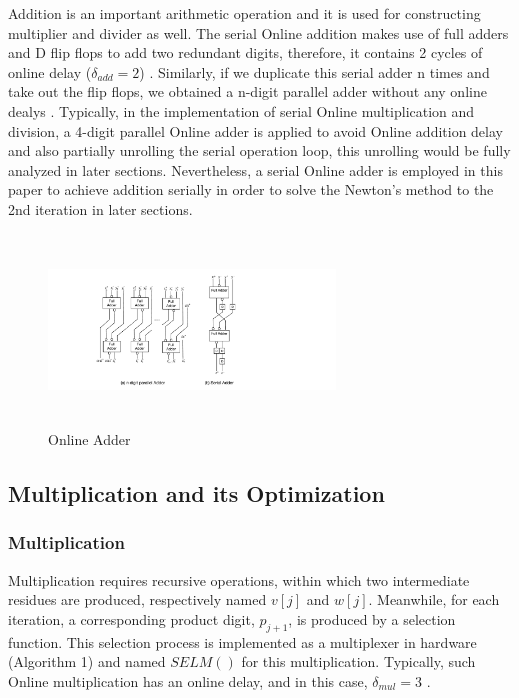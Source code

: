 \documentclass{sig-alternate}
\begin{document}
	Addition is an important arithmetic operation and it is used for constructing multiplier and divider as well. The serial Online addition makes use of full adders and D flip flops to add two redundant digits, therefore, it contains 2 cycles of online delay ($\delta_{add} = 2$) \cite{arithmetic_overview}. Similarly, if we duplicate this serial adder n times and take out the flip flops, we obtained a n-digit parallel adder without any online dealys \cite{Kan_parallel_operators}. 
	Typically, in the implementation of serial Online multiplication and division, a 4-digit parallel Online adder is applied to avoid Online addition delay and also partially unrolling the serial operation loop, this unrolling would be fully analyzed in later sections. Nevertheless, a serial Online adder is employed in this paper to achieve addition serially in order to solve the Newton's method to the 2nd iteration in later sections.   
	\vspace{-10pt}
	\begin{figure} [ht]
		\centering
		\includegraphics[height=2in,width=3in]{Adder}
		\caption{Online Adder}
	\end{figure}
	\vspace{-5pt}
	\subsection{Multiplication and its Optimization}
	\subsubsection{Multiplication}
	Multiplication requires recursive operations, within which two intermediate residues are produced, respectively named $v[j]$ and $w[j]$. 
	Meanwhile, for each iteration, a corresponding product digit, $p_{j+1}$, is produced by a selection function. This selection process is implemented as a multiplexer in hardware (Algorithm 1) and named $SELM()$ for this multiplication\cite{online_mul}. Typically, such Online multiplication has an online delay, and in this case, $\delta_{mul}=3$ \cite{online_mul}. 
	
\end{document}
